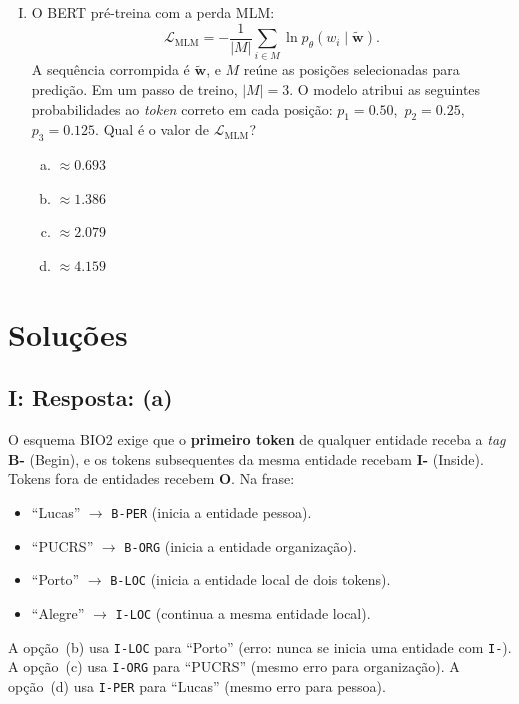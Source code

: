 \documentclass{dlproblemset}
\begin{document}
\begin{enumerate}[I)]
\item O BERT pré-treina com a perda MLM:
      \[
        \mathcal{L}_{\text{MLM}}
          = -\frac{1}{|M|}\sum_{i \in M} \ln p_\theta(w_i \mid \tilde{\mathbf w}).
      \]
      A sequência corrompida é $\tilde{\mathbf w}$, e $M$ reúne as posições
      selecionadas para predição. Em um passo de treino, $|M| = 3$. O modelo
      atribui as seguintes probabilidades ao \textit{token} correto em cada
      posição: $p_1 = 0.50$,\ $p_2 = 0.25$,\ $p_3 = 0.125$.
      Qual é o valor de $\mathcal{L}_{\text{MLM}}$?

\begin{enumerate}[a)]
    \item $\approx 0.693$
    \item $\approx 1.386$
    \item $\approx 2.079$
    \item $\approx 4.159$
\end{enumerate}

\end{enumerate}


\clearpage
\section*{Soluções}

\subsection*{I: Resposta: (a)}
O esquema BIO2 exige que o \textbf{primeiro token} de qualquer entidade receba
a \textit{tag} \textbf{B-} (Begin), e os tokens subsequentes da mesma entidade
recebam \textbf{I-} (Inside). Tokens fora de entidades recebem \textbf{O}.
Na frase:
\begin{itemize}
  \item ``Lucas'' $\to$ \texttt{B-PER} (inicia a entidade pessoa).
  \item ``PUCRS'' $\to$ \texttt{B-ORG} (inicia a entidade organização).
  \item ``Porto'' $\to$ \texttt{B-LOC} (inicia a entidade local de dois tokens).
  \item ``Alegre'' $\to$ \texttt{I-LOC} (continua a mesma entidade local).
\end{itemize}
A opção~(b) usa \texttt{I-LOC} para ``Porto'' (erro: nunca se inicia uma
entidade com \texttt{I-}).
A opção~(c) usa \texttt{I-ORG} para ``PUCRS'' (mesmo erro para organização).
A opção~(d) usa \texttt{I-PER} para ``Lucas'' (mesmo erro para pessoa).
\end{document}
